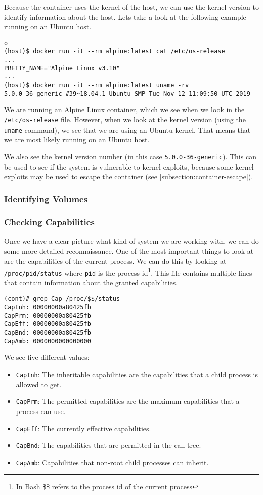 Because the container uses the kernel of the host, we can use the kernel version to identify information about the host. Lets take a look at the following example running on an Ubuntu host.
\begin{lstlisting}o
(host)$ docker run -it --rm alpine:latest cat /etc/os-release 
...
PRETTY_NAME="Alpine Linux v3.10"
...
(host)$ docker run -it --rm alpine:latest uname -rv
5.0.0-36-generic #39~18.04.1-Ubuntu SMP Tue Nov 12 11:09:50 UTC 2019
\end{lstlisting}

We are running an Alpine Linux container, which we see when we look in the \lstinline{/etc/os-release} file. However, when we look at the kernel version (using the \lstinline{uname} command), we see that we are using an Ubuntu kernel. That means that we are most likely running on an Ubuntu host.

\hfill

We also see the kernel version number (in this case \lstinline{5.0.0-36-generic}). This can be used to see if the system is vulnerable to kernel exploits, because some kernel exploits may be used to escape the container (see \autoref{subsection:container-escape}).

\subsubsection{Identifying Volumes}

\subsubsection{Checking Capabilities}
Once we have a clear picture what kind of system we are working with, we can do some more detailed reconnaissance. One of the most important things to look at are the capabilities of the current process. We can do this by looking at \lstinline{/proc/pid/status} where \lstinline{pid} is the process id\footnote{In Bash \$\$ refers to the process id of the current process}. This file contains multiple lines that contain information about the granted capabilities.

\begin{lstlisting}
(cont)# grep Cap /proc/$$/status
CapInh:	00000000a80425fb
CapPrm:	00000000a80425fb
CapEff:	00000000a80425fb
CapBnd:	00000000a80425fb
CapAmb:	0000000000000000
\end{lstlisting}

We see five different values:
\begin{itemize}
    \item \lstinline{CapInh}: The inheritable capabilities are the capabilities that a child process is allowed to get.
    \item \lstinline{CapPrm}: The permitted capabilities are the maximum capabilities that a process can use.
    \item \lstinline{CapEff}: The currently effective capabilities.
    \item \lstinline{CapBnd}: The capabilities that are permitted in the call tree.
    \item \lstinline{CapAmb}: Capabilities that non-root child processes can inherit.
\end{itemize}


